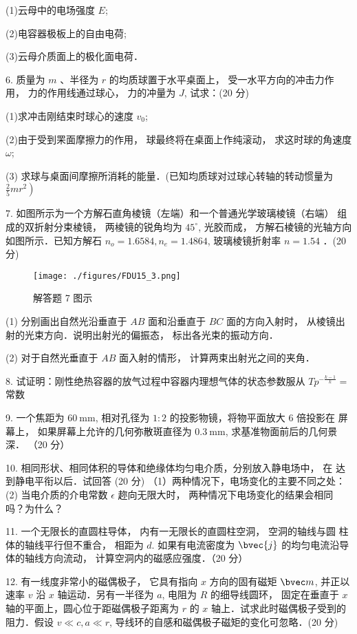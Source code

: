 (1)云母中的电场强度 $E$;

(2)电容器极板上的自由电荷;

(3)云母介质面上的极化面电荷．

6. 质量为 $m$ 、半径为 $r$ 的均质球置于水平桌面上， 受一水平方向的冲击力作用， 力的作用线通过球心， 力的冲量为 $J$, 试求：(20 分)

(1)求冲击刚结束时球心的速度 $v_{0}$;

(2)由于受到䍒面摩擦力的作用， 球最终将在桌面上作纯滚动， 求这时球的角速度 $\omega$;

(3) 求球与桌面间摩擦所消耗的能量．(已知均质球对过球心转轴的转动惯量为 $\left.\frac{2}{5} m r^{2}\right)$

7. 如图所示为一个方解石直角棱镜（左端）和一个普通光学玻璃棱镜（右端） 组成的双折射分束棱镜， 两棱镜的锐角均为 $45^{\circ}$, 光胶而成， 方解石棱镜的光轴方向如图所示．已知方解石 $n_{o}=1.6584, n_{e}=1.4864$, 玻璃棱镜折射率 $n=1.54$ ．(20 分)
\begin{figure}[ht]
\centering
\texttt{[image: ./figures/FDU15\_3.png]}
\caption{解答题 7 图示} \label{FDU15_fig3}
\end{figure}
(1) 分别画出自然光沿垂直于 $A B$ 面和沿垂直于 $B C$ 面的方向入射时， 从棱镜出射的光束方向．说明出射光的偏振态， 标出各光束的振动方向．

(2) 对于自然光垂直于 $A B$ 面入射的情形， 计算两束出射光之间的夹角．

8. 试证明：刚性绝热容器的放气过程中容器内理想气体的状态参数服从 $T p^{-\frac{k-1}{k}}=$ 常数

9. 一个焦距为 $60 \mathrm{~mm}$, 相对孔径为 $1: 2$ 的投影物镜，将物平面放大 $6$ 倍投影在 屏幕上， 如果屏幕上允许的几何弥散斑直径为 $0.3 \mathrm{~mm}$, 求基准物面前后的几何景深．
（20 分）

10. 相同形状、相同体积的导体和绝缘体均匀电介质，分别放入静电场中， 在 达到静电平衔以后．试回答
(20 分)
（1）两种情况下，电场变化的主要不同之处：
(2) 当电介质的介电常数 $\epsilon$ 趂向无限大时， 两种情况下电场变化的结果会相同吗？为什么？

11. 一个无限长的直圆柱导体， 内有一无限长的直圆柱空洞， 空洞的轴线与圆 柱体的轴线平行但不重合， 相距为 $d$. 如果有电流密度为 $\bvec{j}$ 的均匀电流沿导体的轴线方向流动， 计算空洞内的磁感应强度．（20 分）

12. 有一线度非常小的磁偶极子， 它具有指向 $x$ 方向的固有磁矩 $\bvec m$, 并正以速率 $v$ 沿 $x$ 轴运动．另有一半径为 $a$, 电阻为 $R$ 的细导线圆环， 固定在垂直于 $x$ 轴的平面上，圆心位于距磁偶极子距离为 $r$ 的 $x$ 轴上．试求此时磁偶极子受到的阻力．假设 $v \ll c, a \ll r$, 导线环的自感和磁偶极子磁矩的变化可忽略．(20 分)